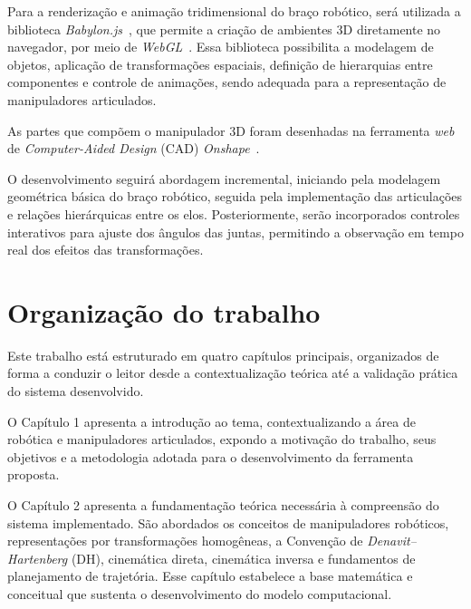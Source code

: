 
Para a renderização e animação tridimensional do braço robótico, será utilizada a biblioteca \textit{Babylon.js}~\cite{babylonjs}, que permite a criação de ambientes 3D diretamente no navegador, por meio de \textit{WebGL}~\cite{webgl}. Essa biblioteca possibilita a modelagem de objetos, aplicação de transformações espaciais, definição de hierarquias entre componentes e controle de animações, sendo adequada para a representação de manipuladores articulados.

As partes que compõem o manipulador 3D foram desenhadas na ferramenta \textit{web} de \textit{Computer-Aided Design} (CAD) \textit{Onshape}~\cite{onshape}.

O desenvolvimento seguirá abordagem incremental, iniciando pela modelagem geométrica básica do braço robótico, seguida pela implementação das articulações e relações hierárquicas entre os elos. Posteriormente, serão incorporados controles interativos para ajuste dos ângulos das juntas, permitindo a observação em tempo real dos efeitos das transformações.

\section{Organizaç{\~ a}o do trabalho}

Este trabalho está estruturado em quatro capítulos principais, organizados de forma a conduzir o leitor desde a contextualização teórica até a validação prática do sistema desenvolvido.

O Capítulo 1 apresenta a introdução ao tema, contextualizando a área de robótica e manipuladores articulados, expondo a motivação do trabalho, seus objetivos e a metodologia adotada para o desenvolvimento da ferramenta proposta.

O Capítulo 2 apresenta a fundamentação teórica necessária à compreensão do sistema implementado. São abordados os conceitos de manipuladores robóticos, representações por transformações homogêneas, a Convenção de \textit{Denavit–Hartenberg} (DH), cinemática direta, cinemática inversa e fundamentos de planejamento de trajetória. Esse capítulo estabelece a base matemática e conceitual que sustenta o desenvolvimento do modelo computacional.

